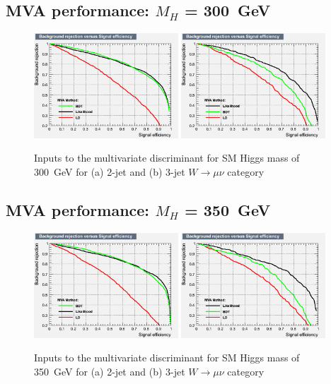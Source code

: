 \subsection{MVA performance: \texorpdfstring{$M_H$}{M(H)} = 300~GeV}
\begin{figure}[ht]
  \centering
  \includegraphics[width=0.48\textwidth]{figs/TMVA_300_nJ2_mu_rejBvsS}
  \includegraphics[width=0.48\textwidth]{figs/TMVA_300_nJ3_mu_rejBvsS}	
  \caption{\label{fig:perf300mu}Inputs to the multivariate discriminant for SM Higgs mass of 300~GeV for (a) 2-jet and (b) 3-jet $W\to\mu\nu$ category}
\end{figure}
\newpage
\subsection{MVA performance: \texorpdfstring{$M_H$}{M(H)} = 350~GeV}
\begin{figure}[ht]
  \centering
  \includegraphics[width=0.48\textwidth]{figs/TMVA_350_nJ2_mu_rejBvsS}
  \includegraphics[width=0.48\textwidth]{figs/TMVA_350_nJ3_mu_rejBvsS}	
  \caption{\label{fig:perf350mu}Inputs to the multivariate discriminant for SM Higgs mass of 350~GeV for (a) 2-jet and (b) 3-jet $W\to\mu\nu$ category}
\end{figure}

